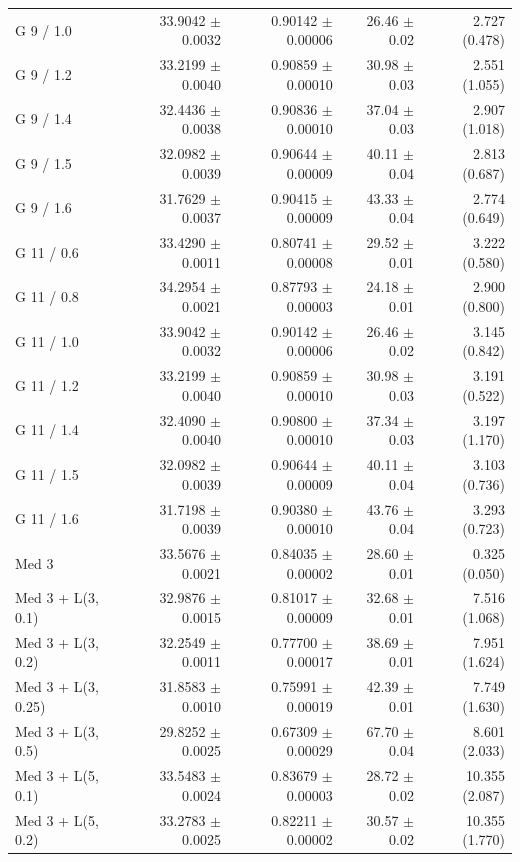 \begin{longtable}{lrrrr}
G 9 / 1.0 & 33.9042 $\pm$ 0.0032 & 0.90142 $\pm$ 0.00006 & 26.46 $\pm$ 0.02 & 2.727 (0.478) \\
G 9 / 1.2 & 33.2199 $\pm$ 0.0040 & 0.90859 $\pm$ 0.00010 & 30.98 $\pm$ 0.03 & 2.551 (1.055) \\
G 9 / 1.4 & 32.4436 $\pm$ 0.0038 & 0.90836 $\pm$ 0.00010 & 37.04 $\pm$ 0.03 & 2.907 (1.018) \\
G 9 / 1.5 & 32.0982 $\pm$ 0.0039 & 0.90644 $\pm$ 0.00009 & 40.11 $\pm$ 0.04 & 2.813 (0.687) \\
G 9 / 1.6 & 31.7629 $\pm$ 0.0037 & 0.90415 $\pm$ 0.00009 & 43.33 $\pm$ 0.04 & 2.774 (0.649) \\
G 11 / 0.6 & 33.4290 $\pm$ 0.0011 & 0.80741 $\pm$ 0.00008 & 29.52 $\pm$ 0.01 & 3.222 (0.580) \\
G 11 / 0.8 & 34.2954 $\pm$ 0.0021 & 0.87793 $\pm$ 0.00003 & 24.18 $\pm$ 0.01 & 2.900 (0.800) \\
G 11 / 1.0 & 33.9042 $\pm$ 0.0032 & 0.90142 $\pm$ 0.00006 & 26.46 $\pm$ 0.02 & 3.145 (0.842) \\
G 11 / 1.2 & 33.2199 $\pm$ 0.0040 & 0.90859 $\pm$ 0.00010 & 30.98 $\pm$ 0.03 & 3.191 (0.522) \\
G 11 / 1.4 & 32.4090 $\pm$ 0.0040 & 0.90800 $\pm$ 0.00010 & 37.34 $\pm$ 0.03 & 3.197 (1.170) \\
G 11 / 1.5 & 32.0982 $\pm$ 0.0039 & 0.90644 $\pm$ 0.00009 & 40.11 $\pm$ 0.04 & 3.103 (0.736) \\
G 11 / 1.6 & 31.7198 $\pm$ 0.0039 & 0.90380 $\pm$ 0.00010 & 43.76 $\pm$ 0.04 & 3.293 (0.723) \\
Med 3 & 33.5676 $\pm$ 0.0021 & 0.84035 $\pm$ 0.00002 & 28.60 $\pm$ 0.01 & 0.325 (0.050) \\
Med 3 + L(3, 0.1) & 32.9876 $\pm$ 0.0015 & 0.81017 $\pm$ 0.00009 & 32.68 $\pm$ 0.01 & 7.516 (1.068) \\
Med 3 + L(3, 0.2) & 32.2549 $\pm$ 0.0011 & 0.77700 $\pm$ 0.00017 & 38.69 $\pm$ 0.01 & 7.951 (1.624) \\
Med 3 + L(3, 0.25) & 31.8583 $\pm$ 0.0010 & 0.75991 $\pm$ 0.00019 & 42.39 $\pm$ 0.01 & 7.749 (1.630) \\
Med 3 + L(3, 0.5) & 29.8252 $\pm$ 0.0025 & 0.67309 $\pm$ 0.00029 & 67.70 $\pm$ 0.04 & 8.601 (2.033) \\
Med 3 + L(5, 0.1) & 33.5483 $\pm$ 0.0024 & 0.83679 $\pm$ 0.00003 & 28.72 $\pm$ 0.02 & 10.355 (2.087) \\
Med 3 + L(5, 0.2) & 33.2783 $\pm$ 0.0025 & 0.82211 $\pm$ 0.00002 & 30.57 $\pm$ 0.02 & 10.355 (1.770) \\

\end{longtable}
